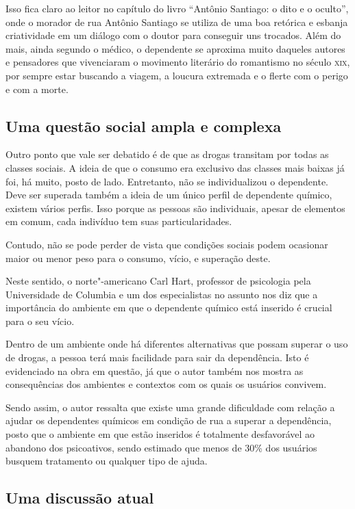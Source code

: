 \documentclass[12pt]{extarticle}
\begin{document}
Isso fica claro ao leitor no capítulo do livro ``Antônio Santiago: o
dito e o oculto'', onde o morador de rua Antônio Santiago se utiliza de
uma boa retórica e esbanja criatividade em um diálogo com o doutor para
conseguir uns trocados. Além do mais, ainda segundo o médico, o
dependente se aproxima muito daqueles autores e pensadores que
vivenciaram o movimento literário do romantismo no século \textsc{xix}, por
sempre estar buscando a viagem, a loucura extremada e o flerte com o
perigo e com a morte.

\subsection{Uma questão social ampla e complexa}

Outro ponto que vale ser debatido é de que as drogas transitam por todas
as classes sociais. A ideia de que o consumo era exclusivo das classes
mais baixas já foi, há muito, posto de lado. Entretanto, não se
individualizou o dependente. Deve ser superada também a ideia de um
único perfil de dependente químico, existem vários perfis. Isso porque
as pessoas são individuais, apesar de elementos em comum, cada indivíduo
tem suas particularidades.


Contudo, não se pode perder de vista que condições sociais podem
ocasionar maior ou menor peso para o consumo, vício, e superação deste.

Neste sentido, o norte"-americano Carl Hart, professor de psicologia pela
Universidade de Columbia e um dos especialistas no assunto nos diz que a
importância do ambiente em que o dependente químico está inserido é
crucial para o seu vício.

Dentro de um ambiente onde há diferentes alternativas que possam superar
o uso de drogas, a pessoa terá mais facilidade para sair da dependência.
Isto é evidenciado na obra em questão, já que o autor também nos mostra
as consequências dos ambientes e contextos com os quais os usuários
convivem.

Sendo assim, o autor ressalta que existe uma grande dificuldade com
relação a ajudar os dependentes químicos em condição de rua a superar a
dependência, posto que o ambiente em que estão inseridos é totalmente
desfavorável ao abandono dos psicoativos, sendo estimado que menos de
30\% dos usuários busquem tratamento ou qualquer tipo de ajuda.

\subsection{Uma discussão atual}
\end{document}
